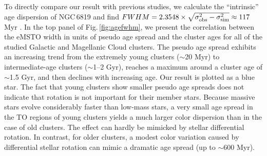 \documentclass[twocolumn]{aastex631}
\begin{document}
To directly compare our result with previous studies, we calculate the ``intrinsic'' age dispersion of NGC\,6819 and find $FWHM = 2.3548\times\sqrt{\sigma_{\rm obs}^2-\sigma_{\rm sim}^2}\approx117$ Myr \citep{milone2015multiple,cordoni2018extended}. In the top panel of Fig.$\,$\ref{fig:agefwhm}, we present the correlation between the eMSTO width in units of pseudo age spread and the cluster ages for all of the studied Galactic and Magellanic Cloud clusters. The pseudo age spread exhibits an increasing trend from the extremely young clusters ($\sim$20 Myr) to intermediate-age clusters ($\sim$1--2 Gyr), reaches a maximum around a cluster age of $\sim$1.5 Gyr, and then declines with increasing age. Our result is plotted as a blue star. The fact that young clusters show smaller pseudo age spreads does not indicate that rotation is not important for their member stars. Because massive stars evolve considerably faster than low-mass stars, a very small age spread in the TO regions of young clusters yields a much larger color dispersion than in the case of old clusters. The effect can hardly be mimicked by stellar differential rotation. In contrast, for older clusters, a modest color variation caused by differential stellar rotation can mimic a dramatic age spread (up to $\sim$600 Myr). 
\end{document}
